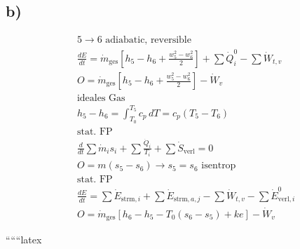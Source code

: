 

\subsection*{b)}

\begin{align*}
&5 \rightarrow 6 \text{ adiabatic, reversible} \\
&\frac{dE}{dt} = \dot{m}_{\text{ges}} \left[ h_5 - h_6 + \frac{w_5^2 - w_6^2}{2} \right] + \sum \dot{Q}_i^0 - \sum \dot{W}_{t,v} \\
&O = \dot{m}_{\text{ges}} \left[ h_5 - h_6 + \frac{w_5^2 - w_6^2}{2} \right] - \dot{W}_v \\
&\boxed{\text{ideales Gas}} \\
&h_5 - h_6 = \int_{T_0}^{T_5} c_p \, dT = c_p (T_5 - T_6) \\
&\text{stat. FP} \\
&\frac{d}{dt} \sum \dot{m}_i s_i + \sum \frac{\dot{Q}_i}{T_i} + \sum \dot{S}_{\text{verl}} = 0 \\
&O = m (s_5 - s_6) \rightarrow s_5 = s_6 \text{ isentrop} \\
&\text{stat. FP} \\
&\frac{dE}{dt} = \sum \dot{E}_{\text{strm},i} + \sum \dot{E}_{\text{strm},a,j} - \sum \dot{W}_{t,v} - \sum \dot{E}_{\text{verl},i}^0 \\
&O = \dot{m}_{\text{ges}} \left[ h_6 - h_5 - T_0 (s_6 - s_5) + ke \right] - \dot{W}_v
\end{align*}

``````latex